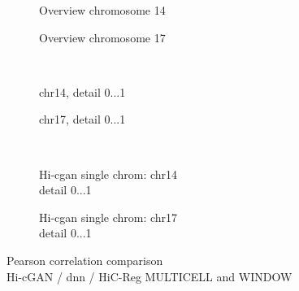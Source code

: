 \begin{figure}[htbp]
 \begin{subfigure}{0.45\textwidth}
  \caption{Overview chromosome 14}\label{fig:results:zhang-vs-ours_pearson_14overview}
 \end{subfigure}\hfill
\begin{subfigure}{0.45\textwidth}
  \caption{Overview chromosome 17}\label{fig:results:zhang-vs-ours_pearson_17overview}
 \end{subfigure}\\[4mm]
 \begin{subfigure}{0.45\textwidth}
  \caption{chr14, detail 0...\SI{1}{\mega\bp}}\label{fig:results:zhang-vs-ours_pearson_14detail}
 \end{subfigure}\hfill
 \begin{subfigure}{0.45\textwidth}
  \caption{chr17, detail 0...\SI{1}{\mega\bp}}\label{fig:results:zhang-vs-ours_pearson_17detail}
 \end{subfigure}\\[4mm]
 \begin{subfigure}{0.45\textwidth}
    \caption[Hi-\acrshort{cgan} single chrom: chr14]{Hi-\acrshort{cgan} single chrom: chr14\\detail 0...\SI{1}{\mega\bp}}\label{fig:results:zhang-vs-ours_pearson_14singlechrom}
 \end{subfigure}\hfill
 \begin{subfigure}{0.45\textwidth}
    \caption[Hi-\acrshort{cgan} single chrom: chr17]{Hi-\acrshort{cgan} single chrom: chr17\\detail 0...\SI{1}{\mega\bp}}\label{fig:results:zhang-vs-ours_pearson_17singlechrom}
 \end{subfigure}
  \caption[Pearson correlation comparison Hi-cGAN / \acrshort{dnn} / HiC-Reg MULTICELL and WINDOW \cite{Zhang2019}]{Pearson correlation comparison\\Hi-cGAN / \acrshort{dnn} / HiC-Reg MULTICELL and WINDOW \cite{Zhang2019}} \label{fig:results:zhang-vs-ours_pearson}
\end{figure}
